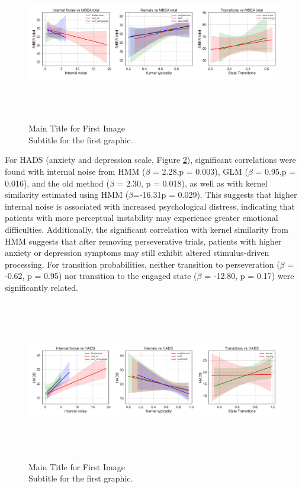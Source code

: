 \begin{figure}[H]
    \centering
    \includegraphics[width=17cm,height=7cm]{MainLayout/Images/chapter8/regression_results_mbea_total.jpg}
    \caption{Main Title for First Image \\ \small Subtitle for the first graphic.}
    \label{fig:regression_results_mbea_total}
\end{figure}
For HADS (anxiety and depression scale, Figure \ref{fig:regression_results_hads}), significant correlations were found with internal noise from HMM ($\beta$ = 2.28,p = 0.003), GLM ($\beta$ = 0.95,p = 0.016), and the old method ($\beta$ = 2.30, p = 0.018), as well as with kernel similarity estimated using HMM ($\beta$=-16.31p = 0.029). This suggests that higher internal noise is associated with increased psychological distress, indicating that patients with more perceptual instability may experience greater emotional difficulties. Additionally, the significant correlation with kernel similarity from HMM suggests that after removing perseverative trials, patients with higher anxiety or depression symptoms may still exhibit altered stimulus-driven processing. 
For transition probabilities, neither transition to perseveration ($\beta$ = -0.62, p = 0.95) nor transition to the engaged state ($\beta$ = -12.80, p = 0.17) were significantly related.
\begin{figure}[H]
    \centering
    \includegraphics[width=17cm,height=7cm]{MainLayout/Images/chapter8/regression_results_hads.jpg}
    \caption{Main Title for First Image \\ \small Subtitle for the first graphic.}
    \label{fig:regression_results_hads}
\end{figure}
